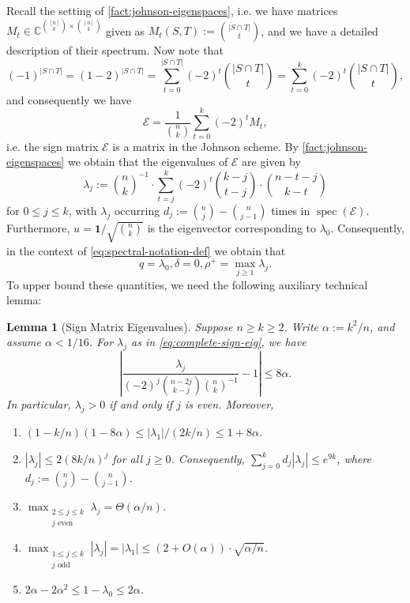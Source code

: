 \documentclass
[11pt,letterpaper]
{article}
\newtheorem{lemma}[theorem]{Lemma}
\theoremstyle{definition}
\newcommand{\cE}{{\mathcal E}}
\newcommand{\1}{\mathbf{1}}
\newcommand{\C}{\mathbb C}
\renewcommand{\geq}{\geqslant}
\renewcommand{\leq}{\leqslant}
\begin{document}
Recall the setting of \cref{fact:johnson-eigenspaces}, i.e. we have matrices $M_t\in\C^{\binom{[n]}{k}\times\binom{[n]}{k}}$ given as $M_t(S, T):= \binom{|S\cap T|}{t}$, and we have a detailed description of their spectrum. Now note that 
\[(-1)^{|S\cap T|} = (1 - 2)^{|S\cap T|} = \sum_{t = 0}^{|S\cap T|}(-2)^t\binom{|S\cap T|}{t} = \sum_{t = 0}^{k}(-2)^t\binom{|S\cap T|}{t},\]
and consequently we have 
\[\cE = \frac{1}{\binom{n}{k}}\sum_{t = 0}^k(-2)^tM_t,\]
i.e. the sign matrix $\cE$ is a matrix in the Johnson scheme. By \cref{fact:johnson-eigenspaces} we obtain that the eigenvalues of $\cE$ are given by
\begin{equation}\label{eq:complete-sign-eig}
    \lambda_j:= \binom{n}{k}^{-1}\cdot\sum_{t = j}^k(-2)^t\binom{k - j}{t - j}\cdot\binom{n - t - j}{k - t}
\end{equation}
for $0\leq j\leq k$, with $\lambda_j$ occurring $d_j:= \binom{n}{j} - \binom{n}{j - 1}$ times in $\operatorname{spec}(\cE)$. Furthermore, $u = \1/\sqrt{\binom{n}{k}}$ is the eigenvector corresponding to $\lambda_0$. Consequently, in the context of \cref{eq:spectral-notation-def} we obtain that 
\begin{equation}\label{eq:complete-param-values}
    q = \lambda_0, \delta = 0, \rho^+ = \max_{j\geq 1}\lambda_j.
\end{equation}
To upper bound these quantities, we need the following auxiliary technical lemma:
\begin{lemma}[Sign Matrix Eigenvalues]\label{lem:complete-matrix-values}
    Suppose $n\geq k\geq 2$. Write $\alpha:= k^2/n$, and assume $\alpha < 1/16$. For $\lambda_j$ as in \cref{eq:complete-sign-eig}, we have
    \begin{equation}\label{eq:lambdaj-estimate}
        \left|\frac{\lambda_j}{(-2)^j\binom{n - 2j}{k - j}\binom{n}{k}^{-1}} - 1\right|\leq 8\alpha.
    \end{equation}
    In particular, $\lambda_j > 0$ if and only if $j$ is even. Moreover, 
    \begin{enumerate}[(1)]
        \item\label{item:lambda1-bound} $(1 - k/n)(1 - 8\alpha)\leq |\lambda_1|/(2k/n)\leq 1 + 8\alpha$.
        \item\label{item:lambdaj-bound} $|\lambda_j|\leq 2(8k/n)^j$ for all $j\geq 0$. Consequently, $\sum_{j = 0}^{k}d_j|\lambda_j|\leq e^{9k}$, where $d_j:= \binom{n}{j} - \binom{n}{j - 1}$.
        \item\label{item:even-lambdaj-upperbound} $\max_{\substack{2\leq j\leq k\\j\text{ even}}}\lambda_j = \Theta(\alpha/n)$.
        \item\label{item:odd-lambdaj-upperbound} $\max_{\substack{1\leq j\leq k\\j\text{ odd}}}|\lambda_j| = |\lambda_1| \leq (2 + O(\alpha))\cdot\sqrt{\alpha/n}$.
        \item $2\alpha - 2\alpha^2\leq 1 - \lambda_0\leq 2\alpha$. 
    \end{enumerate}
\end{lemma}
\end{document}
